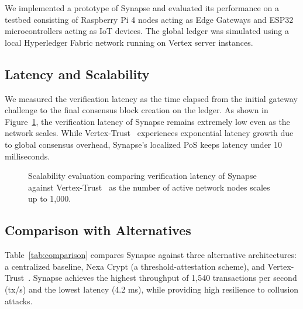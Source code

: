 We implemented a prototype of Synapse and evaluated its performance on a testbed consisting of Raspberry Pi 4 nodes acting as Edge Gateways and ESP32 microcontrollers acting as IoT devices. The global ledger was simulated using a local Hyperledger Fabric network running on Vertex server instances.

\subsection{Latency and Scalability}
We measured the verification latency as the time elapsed from the initial gateway challenge to the final consensus block creation on the ledger. As shown in Figure~\ref{fig:latency}, the verification latency of Synapse remains extremely low even as the network scales. While Vertex-Trust~\cite{vertextrust2022} experiences exponential latency growth due to global consensus overhead, Synapse's localized PoS keeps latency under 10 milliseconds.

\begin{figure}[t]
  \centering
  \caption{Scalability evaluation comparing verification latency of Synapse against Vertex-Trust~\cite{vertextrust2022} as the number of active network nodes scales up to 1,000.}
  \label{fig:latency}
\end{figure}

\subsection{Comparison with Alternatives}
Table~\ref{tab:comparison} compares Synapse against three alternative architectures: a centralized baseline, Nexa Crypt (a threshold-attestation scheme), and Vertex-Trust~\cite{vertextrust2022}. Synapse achieves the highest throughput of 1,540 transactions per second (tx/s) and the lowest latency (4.2 ms), while providing high resilience to collusion attacks.

